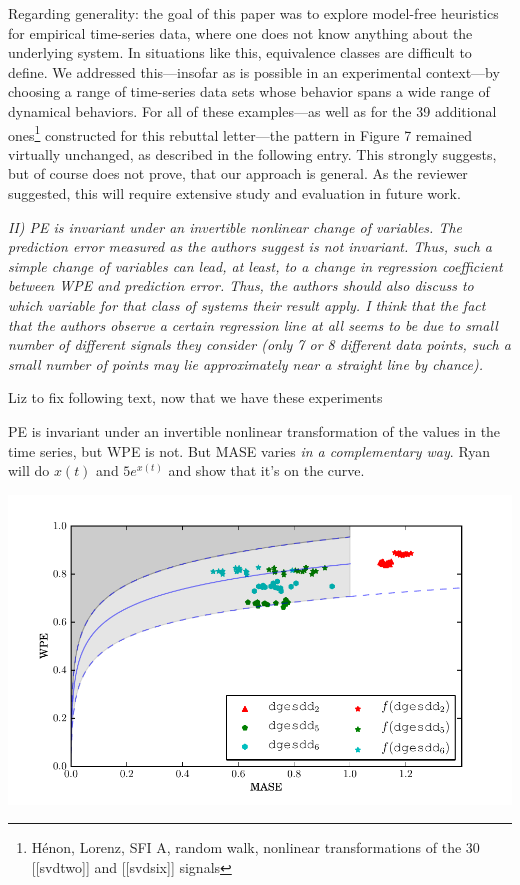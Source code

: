 \documentclass[12pt]{article}
\newcommand{\alert}[1]{{\color{red}#1}}
\begin{document}
Regarding generality: the goal of this paper was to explore model-free
heuristics for empirical time-series data, where one does not know
anything about the underlying system.  In situations like this,
equivalence classes are difficult to define.  We addressed
this---insofar as is possible in an experimental context---by choosing
a range of time-series data sets whose behavior spans a wide range of
dynamical behaviors.  For all of these examples---as well as for the
39 additional ones\footnote{H\'{e}non, Lorenz, SFI A, random walk,
  nonlinear transformations of the 30 [[svdtwo]] and [[svdsix]]
  signals} constructed for this rebuttal letter---the pattern in
Figure 7 remained virtually unchanged, as described in the following
entry.  This strongly suggests, but of course does not prove, that our
approach is general.  As the reviewer suggested, this will require
extensive study and evaluation in future work.

\smallskip

\emph{II) PE is invariant under an invertible nonlinear change of
  variables. The prediction error measured as the authors suggest is
  not invariant. Thus, such a simple change of variables can lead, at
  least, to a change in regression coefficient between WPE and
  prediction error. Thus, the authors should also discuss to which
  variable for that class of systems their result apply. I think that
  the fact that the authors observe a certain regression line at all
  seems to be due to small number of different signals they consider
  (only 7 or 8 different data points, such a small number of points
  may lie approximately near a straight line by chance).}

\alert{Liz to fix following text, now that we have these experiments}

PE is invariant under an invertible nonlinear transformation of the
values in the time series, but WPE is not.  But MASE varies \emph{in a
  complementary way}.  Ryan will do $x(t)$ and $5e^{x(t)}$ and show
that it's on the curve.

\begin{center}
    \includegraphics[width=0.8\columnwidth]{figs/nonlinear_transform_data}
\end{center}
\end{document}
